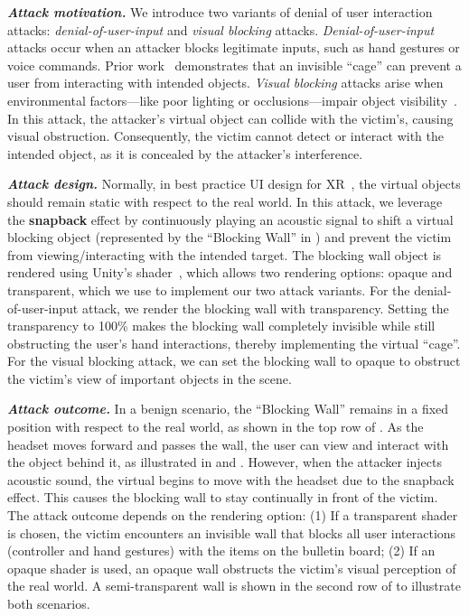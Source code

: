 \noindent \emph{\textbf{Attack motivation.}} We introduce two variants of denial of user interaction attacks: \emph{denial-of-user-input} and \emph{visual blocking} attacks. \emph{Denial-of-user-input} attacks occur when an attacker blocks legitimate inputs, such as hand gestures or voice commands. Prior work~\cite{cheng2024user} demonstrates that an invisible ``cage'' can prevent a user from interacting with intended objects. \emph{Visual blocking} attacks arise when environmental factors—like poor lighting or occlusions—impair object visibility~\cite{huang2024ar,xiu2024lobstar,lebeck2017securing}. In this attack, the attacker’s virtual object can collide with the victim’s, causing visual obstruction. Consequently, the victim cannot detect or interact with the intended object, as it is concealed by the attacker’s interference.

\noindent \emph{\textbf{Attack design.}} 
Normally, in best practice UI design for XR~\cite{laviola20173d}, the virtual objects should remain static with respect to the real world.
In this attack, we leverage the \textbf{snapback} effect by continuously playing an acoustic signal to shift a virtual blocking object (represented by the ``Blocking Wall'' in ) and prevent the victim from viewing/interacting with the intended target.
The blocking wall object is rendered using Unity's shader~\cite{unity_shader}, which allows two rendering options: opaque and transparent, which we use to implement our two attack variants. For the denial-of-user-input attack, we render the blocking wall with transparency. Setting the transparency to 100\% makes the blocking wall completely invisible while still obstructing the user’s hand interactions, thereby implementing the virtual ``cage''\cite{cheng2024user}. For the visual blocking attack, we can set the blocking wall to opaque to obstruct the victim's view of important objects in the scene.



\noindent \emph{\textbf{Attack outcome.}} In a benign scenario, the ``Blocking Wall'' remains in a fixed position with respect to the real world, as shown in the top row of .
As the headset moves forward and passes the wall, the user can view and interact with the object behind it, as illustrated in  and . 
However, when the attacker injects acoustic sound, the virtual begins to move with the headset due to the snapback effect. This causes the blocking wall to stay continually in front of the victim.
The attack outcome depends on the rendering option: (1) If a transparent shader is chosen, the victim encounters an invisible wall that blocks all user interactions (\eg controller and hand gestures) with the items on the bulletin board; (2) If an opaque shader is used, an opaque wall obstructs the victim's visual perception of the real world.
A semi-transparent wall is shown in the second row of  to illustrate both scenarios.




